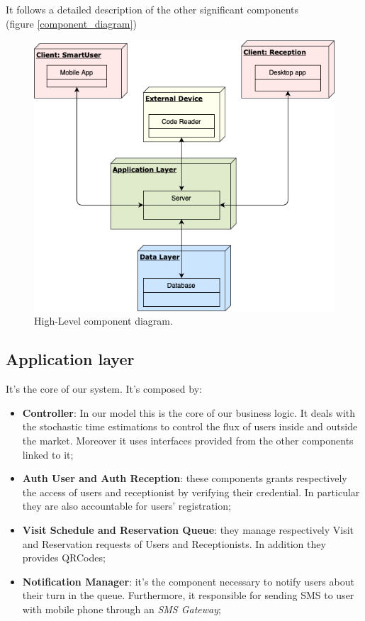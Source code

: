 It follows a detailed description of the other significant components \\
(figure \ref{component_diagram})

\begin{figure}[H]
  \centering
  \includegraphics[scale=0.48]{diagrams/h_level.png}
  \caption{High-Level component diagram.}
    \label{fig:highlevel}

\end{figure}





\pagebreak
\subsection{Application layer}
It's the core of our system. It's composed by:
\begin{itemize}
\item \textbf{Controller}: In our model this is the core of our business logic. It deals with the stochastic time estimations to control the flux of users inside and outside the market. Moreover it uses interfaces provided from the other components linked to it;
\item \textbf{Auth User and Auth Reception}: these components grants respectively the access of users and receptionist by verifying their credential. In particular they are also accountable for users' registration;
\item \textbf{Visit Schedule and Reservation Queue}: they manage respectively Visit and Reservation requests of Users and Receptionists. In addition they provides QRCodes;
\item \textbf{Notification Manager}: it's the component necessary to notify users about their turn in the queue. Furthermore, it responsible for sending SMS to user with mobile phone through an \textit{SMS Gateway};
\end{itemize}


